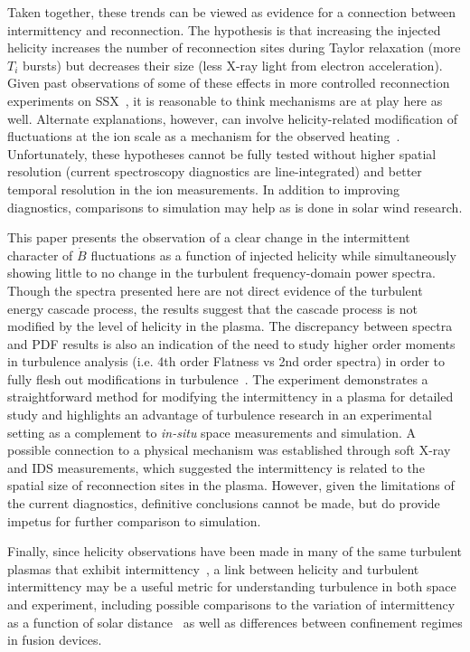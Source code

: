 \documentclass[aps,prl,amsmath,amssymb,reprint,superscriptaddress]{revtex4-1} %
\begin{document}
Taken together, these trends can be viewed as evidence for a connection between intermittency and reconnection. The hypothesis is that increasing the injected helicity increases the number of reconnection sites during Taylor relaxation (more $T_{i}$ bursts) but decreases their size (less X-ray light from electron acceleration). Given past observations of some of these effects in more controlled reconnection experiments on SSX~\cite{brown12}, it is reasonable to think mechanisms are at play here as well. Alternate explanations, however, can involve helicity-related modification of fluctuations at the ion scale as a mechanism for the observed heating~\cite{wu13,osman11}. Unfortunately, these hypotheses cannot be fully tested without higher spatial resolution (current spectroscopy diagnostics are line-integrated) and better temporal resolution in the ion measurements. In addition to improving diagnostics, comparisons to simulation may help as is done in solar wind research.

This paper presents the observation of a clear change in the intermittent character of $\dot{B}$ fluctuations as a function of injected helicity while simultaneously showing little to no change in the turbulent frequency-domain power spectra. Though the spectra presented here are not direct evidence of the turbulent energy cascade process, the results suggest that the cascade process is not modified by the level of helicity in the plasma. The discrepancy between spectra and PDF results is also an indication of the need to study higher order moments in turbulence analysis (i.e. 4th order Flatness vs 2nd order spectra) in order to fully flesh out modifications in turbulence~\cite{matthaeusVelli11}. The experiment demonstrates a straightforward method for modifying the intermittency in a plasma for detailed study and highlights an advantage of turbulence research in an experimental setting as a complement to {\it in-situ} space measurements and simulation. A possible connection to a physical mechanism was established through soft X-ray and IDS measurements, which suggested the intermittency is related to the spatial size of reconnection sites in the plasma. However, given the limitations of the current diagnostics, definitive conclusions cannot be made, but do provide impetus for further comparison to simulation.

Finally, since helicity observations have been made in many of the same turbulent plasmas that exhibit intermittency~\cite{goldstein94, ji95, telloni12}, a link between helicity and turbulent intermittency may be a useful metric for understanding turbulence in both space and experiment, including possible comparisons to the variation of intermittency as a function of solar distance~\cite{greco12} as well as differences between confinement regimes in fusion devices.
\end{document}
